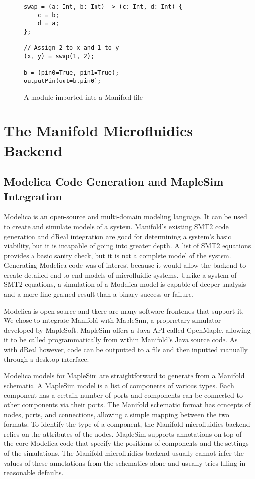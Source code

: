 \begin{figure}[!ht]
\label{fig:unpacking}
\caption{A module imported into a Manifold file}
\begin{lstlisting}
swap = (a: Int, b: Int) -> (c: Int, d: Int) {
    c = b;
    d = a;
};

// Assign 2 to x and 1 to y
(x, y) = swap(1, 2);

b = (pin0=True, pin1=True);
outputPin(out=b.pin0);
\end{lstlisting}
\end{figure}

\section{The Manifold Microfluidics Backend}

\subsection{Modelica Code Generation and MapleSim Integration}

Modelica is an open-source and multi-domain modeling language.
It can be used to create and simulate models of a system.
Manifold's existing SMT2 code generation and dReal integration are good for determining a system's basic viability, but it is incapable of going into greater depth.
A list of SMT2 equations provides a basic sanity check, but it is not a complete model of the system.
Generating Modelica code was of interest because it would allow the backend to create detailed end-to-end models of microfluidic systems.
Unlike a system of SMT2 equations, a simulation of a Modelica model is capable of deeper analysis and a more fine-grained result than a binary success or failure.

Modelica is open-source and there are many software frontends that support it.
We chose to integrate Manifold with MapleSim, a proprietary simulator developed by MapleSoft.
MapleSim offers a Java API called OpenMaple, allowing it to be called programmatically from within Manifold's Java source code.
As with dReal however, code can be outputted to a file and then inputted manually through a desktop interface.

Modelica models for MapleSim are straightforward to generate from a Manifold schematic.
A MapleSim model is a list of components of various types.
Each component has a certain number of ports and components can be connected to other components via their ports.
The Manifold schematic format has concepts of nodes, ports, and connections, allowing a simple mapping between the two formats.
To identify the type of a component, the Manifold microfluidics backend relies on the attributes of the nodes.
MapleSim supports annotations on top of the core Modelica code that specify the positions of components and the settings of the simulations.
The Manifold microfluidics backend usually cannot infer the values of these annotations from the schematics alone and usually tries filling in reasonable defaults.

